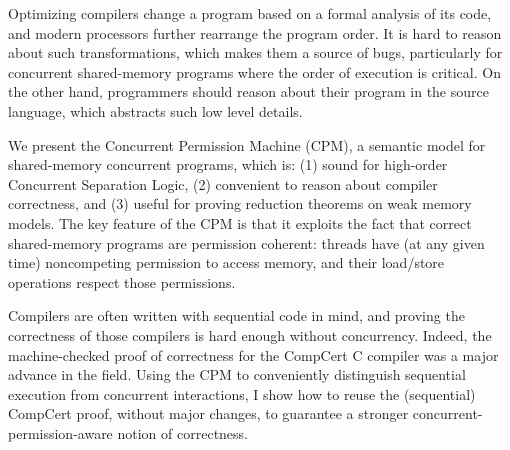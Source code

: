 Optimizing compilers change a program based on a formal analysis of its code, and
modern processors further rearrange the program order. It is hard to reason about such 
transformations, which makes them a source of bugs, particularly for concurrent 
shared-memory programs where the order of execution is critical. On the other hand, 
programmers should reason about their program in the source language, which abstracts 
such low level details. 

We present the Concurrent Permission Machine (CPM), a semantic model for
shared-memory concurrent programs, which is: (1) sound for high-order Concurrent 
Separation Logic, (2) convenient to reason about compiler correctness, and (3) useful 
for proving reduction theorems on weak memory models. The key feature of the CPM
is that it exploits the fact that correct shared-memory programs are permission coherent: 
threads have (at any given time) noncompeting permission to access memory, and their
load/store operations respect those permissions.

Compilers are often written with sequential code in mind, and proving the correctness of
those compilers is hard enough without concurrency. Indeed, the machine-checked 
proof of correctness for the CompCert C compiler was a major advance in the field. 
Using the CPM to conveniently distinguish sequential execution from concurrent 
interactions, I show how to reuse the (sequential) CompCert proof, without major changes, 
to guarantee a stronger concurrent-permission-aware notion of correctness.